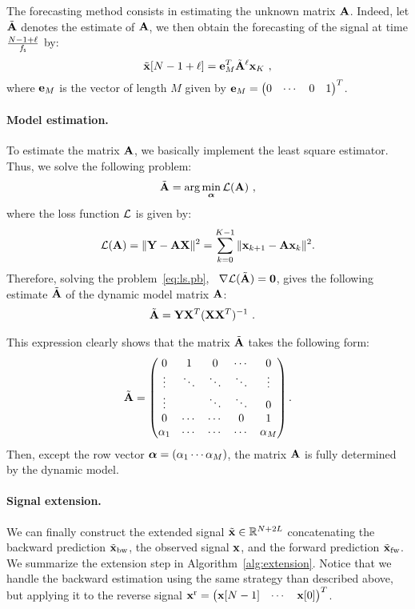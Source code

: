 The forecasting method consists in estimating the unknown matrix ${\mathbf A}$. Indeed, let $\tilde{{\mathbf A}}$ denotes the estimate of ${\mathbf A}$, we then obtain the forecasting of the signal at time $\frac{N-1+\ell}{f_{\mathsf s}}$ by:
\begin{equation}
\label{eq:prediction}
\tilde {{\mathbf x}} [N-1+\ell] = {\mathbf e}_M^T\tilde{{\mathbf A}}^\ell{\mathbf x}_{K}\ ,
\end{equation}  
where ${\mathbf e}_M$ is the vector of length $M$ given by ${\mathbf e}_M = \begin{pmatrix} 0 & \cdots & 0 & 1\end{pmatrix}^T$.

\paragraph{Model estimation.} To estimate the matrix ${\mathbf A}$, we basically implement the least square estimator. Thus, we solve the following problem:
\begin{equation}
\label{eq:ls.pb}
\tilde{{\mathbf A}} = \arg\min_{\boldsymbol{\alpha}} {\mathcal L}({\mathbf A})\ ,
\end{equation}
where the loss function ${\mathcal L}$ is given by:
\[
{\mathcal L}({\mathbf A}) = \|{\mathbf Y}-{\mathbf A}{\mathbf X}\|^2 = \sum_{k=0}^{K-1} \|{\mathbf x}_{k+1}-{\mathbf A}{\mathbf x}_k\|^2.
\]
Therefore, solving the problem~\eqref{eq:ls.pb}, \ie~$\nabla {\mathcal L}(\tilde{{\mathbf A}})=\boldsymbol{0}$, gives the following estimate $\tilde{{\mathbf A}}$ of the dynamic model matrix ${\mathbf A}$:
\begin{align}
\tilde{{\mathbf A}} &= {\mathbf Y}{\mathbf X}^T({\mathbf X}{\mathbf X}^T)^{-1}\ .
\label{eq:lse}
\end{align}

\begin{remark}
This expression clearly shows that the matrix $\tilde{{\mathbf A}}$ takes the following form:
\[
\tilde{{\mathbf A}} =
\begin{pmatrix}
0       & 1       & 0      & \cdots & 0      \\
\vdots  & \ddots  & \ddots & \ddots & \vdots  \\
\vdots  &         & \ddots & \ddots & 0  \\
0       & \cdots  & \cdots & 0      & 1  \\
\alpha_1& \cdots  & \cdots & \cdots & \alpha_M  \\
\end{pmatrix}.
\]
Then, except the row vector $\boldsymbol{\alpha} = \left(\alpha_1 \cdots\alpha_M\right)$, the matrix ${\mathbf A}$ is fully determined by the dynamic model.
\end{remark}

\paragraph{Signal extension.} We can finally construct the extended signal $\tilde{{\mathbf x}}\in{\mathbb R}^{N+2L}$ concatenating the backward prediction $\tilde{{\mathbf x}}_{\rm bw}$, the observed signal ${\mathbf x}$, and the forward prediction $\tilde{{\mathbf x}}_{\rm fw}$. We summarize the extension step in Algorithm~\ref{alg:extension}. Notice that we handle the backward estimation using the same strategy than described above, but applying it to the reverse signal ${\mathbf x}^{\rm r} = \begin{pmatrix} {\mathbf x}[N-1] & \cdots & {\mathbf x}[0] \end{pmatrix}^T$.

